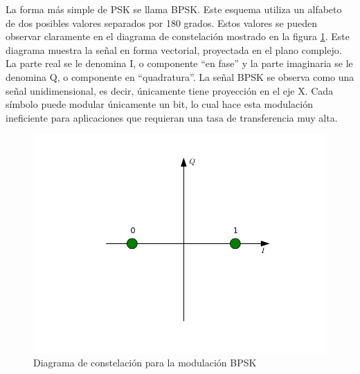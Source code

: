 La forma m\'as simple de PSK se llama BPSK. Este esquema utiliza un alfabeto de
dos posibles valores separados por 180 grados. Estos valores se pueden observar
claramente en el diagrama de constelaci\'on mostrado en la figura
\ref{fig:bpskconst}. Este diagrama muestra la se\~nal en forma vectorial,
proyectada en el plano complejo. La parte real se le denomina I, o componente ``en fase'' y
la parte imaginaria se le denomina Q, o componente en ``quadratura''. La se\~nal
BPSK se observa como una se\~nal unidimensional, es decir, \'unicamente tiene
proyecci\'on en el eje X. Cada s\'imbolo puede modular \'unicamente un bit, lo
cual hace esta modulaci\'on ineficiente para aplicaciones que requieran una tasa
de transferencia muy alta.
\begin{figure}[hpt]
\centering
	\includegraphics[width=5.5in]{figs/bpsk}
	\caption{Diagrama de constelaci\'on para la modulaci\'on BPSK}
	\label{fig:bpskconst}
\end{figure}

